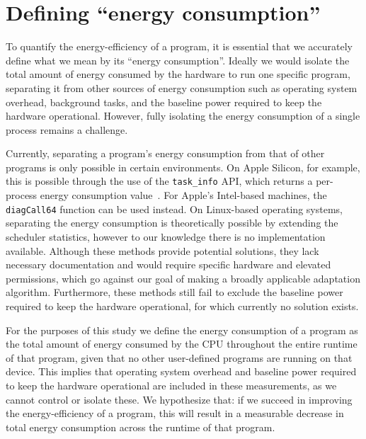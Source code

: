 \section{Defining ``energy consumption''}\label{sec:defining-energy}
To quantify the energy-efficiency of a program, it is essential that we accurately define what we
mean by its ``energy consumption''. Ideally we would isolate the total amount of energy consumed by
the hardware to run one specific program, separating it from other sources of energy consumption
such as operating system overhead, background tasks, and the baseline power required to keep the
hardware operational. However, fully isolating the energy consumption of a single process remains a
challenge.

Currently, separating a program's energy consumption from that of other programs is only possible in
certain environments. On Apple Silicon, for example, this is possible through the use of the
\verb|task_info| API, which returns a per-process energy consumption value~\cite{firefox-profiling}.
For Apple's Intel-based machines, the \verb|diagCall64| function can be used instead. On Linux-based
operating systems, separating the energy consumption is theoretically possible by extending the
scheduler statistics, however to our knowledge there is no implementation available. Although these
methods provide potential solutions, they lack necessary documentation and would require specific
hardware and elevated permissions, which go against our goal of making a broadly applicable
adaptation algorithm. Furthermore, these methods still fail to exclude the baseline power required
to keep the hardware operational, for which currently no solution exists.

For the purposes of this study we define the energy consumption of a program as the total amount of
energy consumed by the CPU throughout the entire runtime of that program, given that no other
user-defined programs are running on that device. This implies that operating system overhead and
baseline power required to keep the hardware operational are included in these measurements, as we
cannot control or isolate these. We hypothesize that: if we succeed in improving the
energy-efficiency of a program, this will result in a measurable decrease in total energy
consumption across the runtime of that program.

